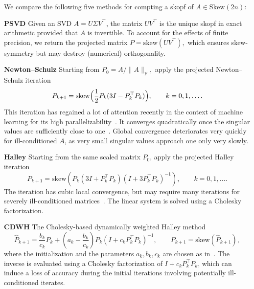 \documentclass[final,onefignum,onetabnum,dvipsnames]{siamart251216}
\numberwithin{algorithm}{section}
\numberwithin{equation}{section}
\begin{document}
\noindent We compare the following five methods for compting a skopf of $A \in \mathrm{Skew}(2n)$:
\begin{paragraph}{\bf PSVD} Given an SVD 
$A=U\Sigma V^\top$, the matrix $UV^\top$ is the unique skopf in exact arithmetic provided that $A$ is invertible.
To account for the effects of finite precision, we return the projected matrix
$
        P=\mathrm{skew}(UV^\top),
$
    which ensures skew-symmetry but may destroy (numerical) orthogonality.
\end{paragraph}
\begin{paragraph}{\bf Newton--Schulz}
    Starting from
$
        P_0={A} / {\|A\|_\mathrm{F}},
$ apply the projected Newton--Schulz iteration
    \[
        P_{k+1}
        =
        \mathrm{skew}\Bigl(
        \frac12P_k(3I-P_k^\top P_k)
        \Bigr),
        \qquad k=0,1,\ldots.
    \]
    This iteration has regained a lot of attention recently in the context of machine learning for its high parallelizability~\cite{GrishinaSmirnovRakhuba2026,jordan2024muon}.
    It converges quadratically once the singular values are
    sufficiently close to one~\cite{BjorckBowie1971}.
    Global convergence deteriorates very quickly for ill-conditioned $A$, as 
    very small singular
    values approach one only very slowly.
\end{paragraph}
\begin{paragraph}{\bf Halley}
    Starting from the same scaled matrix $P_0$, apply the projected
    Halley iteration
    \[
        P_{k+1}
        =
        \mathrm{skew}\left(
        P_k(3I+P_k^\top P_k)
        (I+3P_k^\top P_k)^{-1}
        \right),
        \qquad k=0,1,\ldots.
    \]
    The iteration has cubic local convergence, but may require many
    iterations for severely ill-conditioned matrices~\cite{Gander1990Polar,
    NakatsukasaBaiGygi2010}. The linear system is solved using a
    Cholesky factorization.
\end{paragraph}
\begin{paragraph}{\bf CDWH}
    The Cholesky-based dynamically weighted Halley method~\cite{NakatsukasaBaiGygi2010} 
    \[
        \widehat P_{k+1}
        =
        \frac{b_k}{c_k}P_k
        +
        \left(a_k-\frac{b_k}{c_k}\right)
        P_k(I+c_kP_k^\top P_k)^{-1},
        \qquad
        P_{k+1}=\mathrm{skew}(\widehat P_{k+1}),
    \]
     where the initialization and the parameters $a_k,b_k,c_k$ are chosen
    as in~\cite{NakatsukasaBaiGygi2010}.
    The inverse  is evaluated using a Cholesky
factorization of $I+c_kP_k^\top P_k$, which can induce a loss of accuracy during the initial iterations involving potentially ill-conditioned iterates.
\end{paragraph}
\end{document}
